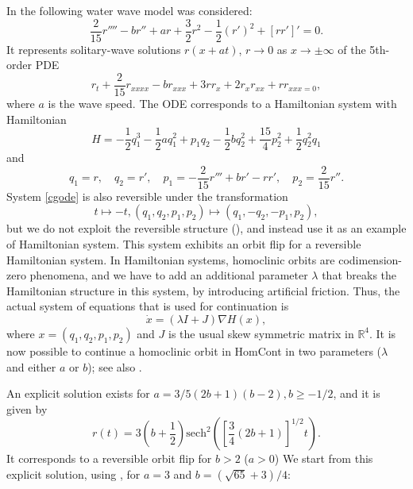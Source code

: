 \documentclass[12pt]{report}
\begin{document}
In  the following water wave model was considered:
\begin{equation}
\frac{2}{15}r''''-b r''+ar+\frac{3}{2}r^2-
\frac{1}{2}(r')^2+[rr']' = 0.
\label{cgode}
\end{equation}
It represents solitary-wave solutions $r(x+at)$, $r\to 0$ as $x\to
\pm\infty$ of the 5th-order PDE
\[
r_t+\frac{2}{15}r_{xxxx}-b r_{xxx}+3r r_x+2 r_x r_{xx}+r r_{xxx=0},
\]
where $a$ is the wave speed.
The ODE corresponds to a Hamiltonian system with Hamiltonian
\[ H=-\frac{1}{2}q_1^3-\frac{1}{2}a q_1^2+p_1 q_2-\frac{1}{2}b q_2^2+
\frac{15}{4}p_2^2+\frac{1}{2}q_2^2 q_1 \]
and 
\[q_1=r, \quad q_2=r', \quad p_1=-\frac{2}{15}r'''+br'-rr', \quad p_2=\frac{2}{15}r''.\]
System \eqref{cgode} is also reversible under the transformation 
\[ t \mapsto -t, (q_1,q_2,p_1,p_2)\mapsto (q_1,-q_2,-p_1,p_2),\] 
but we do not exploit the reversible structure (), and
instead use it as an example of Hamiltonian system.
This system exhibits an orbit flip for a reversible Hamiltonian system.
In Hamiltonian systems, homoclinic orbits are codimension-zero
phenomena, and we have to add an additional parameter $\lambda$ that breaks
the Hamiltonian structure in this system, by introducing artificial friction.
Thus, the actual system of equations that is
used for continuation is
\[\dot x=(\lambda I + J)\nabla H(x),\]
where $x=(q_1,q_2,p_1,p_2)$ and $J$ is the usual skew symmetric matrix
in $\mathbb{R}^4$.
It is now possible to continue a homoclinic orbit in {\cal HomCont} in two
parameters ($\lambda$ and either $a$ or $b$); see also
.

An explicit solution exists for $a=3/5(2b+1)(b-2), b\geq -1/2$, and it is
given by 
\[r(t)=3(b+\frac{1}{2})\mathrm{sech}^2\left([\frac{3}{4}(2b+1)]^{1/2}t\right).\]
It corresponds to a reversible orbit flip for $b>2$ ($a>0$) 
We start from this explicit solution, using , for $a=3$ and
$b=(\sqrt{65}+3)/4$:
\end{document}
